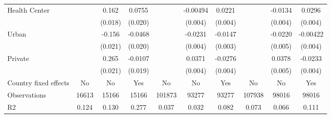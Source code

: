 {\begin{tabular}{l*{9}{c}}
Health Center   &                  &    0.162\sym{***}&   0.0755\sym{***}&                  & -0.00494         &   0.0221\sym{***}&                  &  -0.0134\sym{***}&   0.0296\sym{***}\\
                &                  &  (0.018)         &  (0.020)         &                  &  (0.004)         &  (0.004)         &                  &  (0.004)         &  (0.004)         \\
Urban           &                  &   -0.156\sym{***}&  -0.0468\sym{**} &                  &  -0.0231\sym{***}&  -0.0147\sym{***}&                  &  -0.0220\sym{***}& -0.00422         \\
                &                  &  (0.021)         &  (0.020)         &                  &  (0.004)         &  (0.003)         &                  &  (0.005)         &  (0.004)         \\
Private         &                  &    0.265\sym{***}&  -0.0107         &                  &   0.0371\sym{***}&  -0.0276\sym{***}&                  &   0.0378\sym{***}&  -0.0233\sym{***}\\
                &                  &  (0.021)         &  (0.019)         &                  &  (0.004)         &  (0.004)         &                  &  (0.005)         &  (0.004)         \\
\hline
Country fixed effects&       No         &       No         &      Yes         &       No         &       No         &      Yes         &       No         &       No         &      Yes         \\
Observations    &    16613         &    15166         &    15166         &   101873         &    93277         &    93277         &   107938         &    98016         &    98016         \\
R2              &    0.124         &    0.130         &    0.277         &    0.037         &    0.032         &    0.082         &    0.073         &    0.066         &    0.111         \\
\hline\hline
\end{tabular}
}
